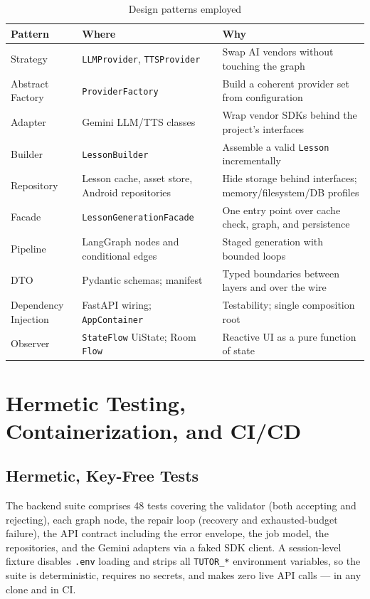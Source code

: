 \begin{table}[htbp]
\caption{Design patterns employed}
\label{tab:patterns}
\centering
\small
\renewcommand{\arraystretch}{1.3}
\begin{tabular}{@{}lp{}p{}@{}}
\toprule
\textbf{Pattern} & \textbf{Where} & \textbf{Why}\\
\midrule
Strategy & \texttt{LLMProvider}, \texttt{TTSProvider} & Swap AI vendors
without touching the graph\\
Abstract Factory & \texttt{ProviderFactory} & Build a coherent provider set
from configuration\\
Adapter & Gemini LLM/TTS classes & Wrap vendor SDKs behind the project's
interfaces\\
Builder & \texttt{LessonBuilder} & Assemble a valid \texttt{Lesson}
incrementally\\
Repository & Lesson cache, asset store, Android repositories & Hide storage
behind interfaces; memory/filesystem/DB profiles\\
Facade & \texttt{LessonGenerationFacade} & One entry point over cache check,
graph, and persistence\\
Pipeline & LangGraph nodes and conditional edges & Staged generation with
bounded loops\\
DTO & Pydantic schemas; manifest & Typed boundaries between layers and over
the wire\\
Dependency Injection & FastAPI wiring; \texttt{AppContainer} & Testability;
single composition root\\
Observer & \texttt{StateFlow} UiState; Room \texttt{Flow} & Reactive UI as a
pure function of state\\
\bottomrule
\end{tabular}
\end{table}

\section{Hermetic Testing, Containerization, and CI/CD}
\label{sec:infra}

\subsection{Hermetic, Key-Free Tests}

The backend suite comprises 48 tests covering the validator (both accepting
and rejecting), each graph node, the repair loop (recovery and
exhausted-budget failure), the API contract including the error envelope, the
job model, the repositories, and the Gemini adapters via a faked SDK client.
A session-level fixture disables \texttt{.env} loading and strips all
\texttt{TUTOR\_*} environment variables, so the suite is deterministic,
requires no secrets, and makes zero live API calls --- in any clone and in
CI.

